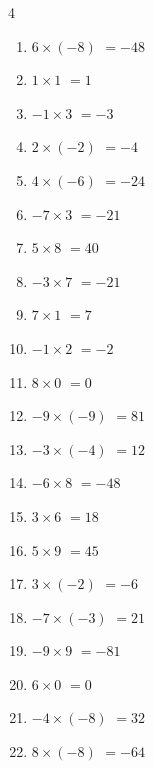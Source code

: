 \begin{multicols}{4}
\begin{enumerate}
  \item $6\times (-8)$
        $=-48$

  \item $1\times 1$
        $=1$

  \item $-1\times 3$
        $=-3$

  \item $2\times (-2)$
        $=-4$

  \item $4\times (-6)$
        $=-24$

  \item $-7\times 3$
        $=-21$

  \item $5\times 8$
        $=40$

  \item $-3\times 7$
        $=-21$

  \item $7\times 1$
        $=7$

  \item $-1\times 2$
        $=-2$

  \item $8\times 0$
        $=0$

  \item $-9\times (-9)$
        $=81$

  \item $-3\times (-4)$
        $=12$

  \item $-6\times 8$
        $=-48$

  \item $3\times 6$
        $=18$

  \item $5\times 9$
        $=45$

\columnbreak %

  \item $3\times (-2)$
        $=-6$

  \item $-7\times (-3)$
        $=21$

  \item $-9\times 9$
        $=-81$

  \item $6\times 0$
        $=0$

  \item $-4\times (-8)$
        $=32$

  \item $8\times (-8)$
        $=-64$


\end{enumerate}
\end{multicols}
